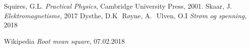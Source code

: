 \documentclass[%
 reprint,
 amsmath,amssymb,
 aps,
]{revtex4-1}
\begin{document}
\begin{thebibliography}{9}
Squires, G.L. \emph{Practical Physics}, Cambridge University Press, 2001.
Skaar, J. \emph{Elektromagnetisme}, 2017
Dysthe, D.K\,\, Røyne, A.\,\, Ulven, O.I \emph{Strøm og spenning}, 2018

Wikipedia \emph{Root mean square}, 07.02.2018

\end{thebibliography}
\end{document}
